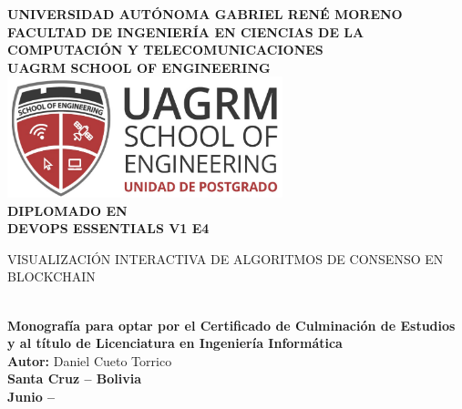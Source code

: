 \documentclass[spanish,12pt,letterpaper]{report}
\begin{document}
\sloppy 



\begin{titlepage}
\centering %


{\Large\bfseries UNIVERSIDAD AUTÓNOMA GABRIEL RENÉ MORENO}\\[0.5cm]
{\normalsize\bfseries FACULTAD DE INGENIERÍA EN CIENCIAS DE LA COMPUTACIÓN Y TELECOMUNICACIONES}\\[0.3cm]
{\normalsize\bfseries UAGRM SCHOOL OF ENGINEERING}\\[1cm]

\includegraphics[width=8cm]{logo-postgrado.png}\\[1cm]

{\Large\bfseries DIPLOMADO EN}\\[0.2cm] 
{\Large\bfseries DEVOPS ESSENTIALS V1 E4}\\[1.6cm] 

{\LARGE\bfseries\begin{minipage}{0.9\textwidth}\centering
VISUALIZACIÓN INTERACTIVA DE ALGORITMOS DE CONSENSO EN BLOCKCHAIN
\end{minipage}}\\[1.5cm]

{\large\bfseries Monografía para optar por el Certificado de Culminación de Estudios y al título de Licenciatura en Ingeniería Informática}\\[1.2cm]
{\large\bfseries Autor:} {\large Daniel Cueto Torrico}\\[0.5cm]

{\large\bfseries Santa Cruz – Bolivia}\\[0.2cm]
{\large\bfseries Junio – \the\year}
\end{titlepage}
\end{document}
